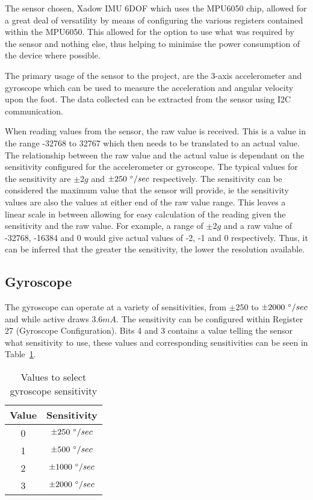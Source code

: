 
The sensor chosen, Xadow IMU 6DOF which uses the MPU6050 chip, allowed for a great deal of versatility by means of configuring the various registers contained within the MPU6050. This allowed for the option to use what was required by the sensor and nothing else, thus helping to minimise the power consumption of the device where possible. \cite{sensor_specs}

The primary usage of the sensor to the project, are the 3-axis accelerometer and gyroscope which can be used to measure the acceleration and angular velocity upon the foot. The data collected can be extracted from the sensor using I2C communication. 

When reading values from the sensor, the raw value is received. This is a value in the range -32768 to 32767 which then needs to be translated to an actual value. The relationship between the raw value and the actual value is dependant on the sensitivity configured for the accelerometer or gyroscope. The typical values for the sensitivity are $\pm 2g$ and $\pm 250~\degree / sec$ respectively. The sensitivity can be considered the maximum value that the sensor will provide, ie the sensitivity values are also the values at either end of the raw value range. This leaves a linear scale in between allowing for easy calculation of the reading given the sensitivity and the raw value. For example, a range of $\pm 2g$ and a raw value of -32768, -16384 and 0 would give actual values of -2, -1 and 0 respectively. Thus, it can be inferred that the greater the sensitivity, the lower the resolution available. \cite{sensor_raw_explanation}

\subsection{Gyroscope}

The gyroscope can operate at a variety of sensitivities, from $\pm 250$ to $\pm 2000~\degree / sec$ and while active draws $3.6mA$. The sensitivity can be configured within Register 27 (Gyroscope Configuration). Bits 4 and 3 contains a value telling the sensor what sensitivity to use, these values and corresponding sensitivities can be seen in Table~\ref{tab:gyro:range}. \cite{sensor_registers}

\begin{table}
	\centering
	\begin{tabular}{|c|c|}
		\hline
		Value & Sensitivity \\
		\hline
		0 & $\pm 250~\degree / sec$ \\
		1 & $\pm 500~\degree / sec$ \\
		2 & $\pm 1000~\degree / sec$ \\
		3 & $\pm 2000~\degree / sec$ \\
		\hline
	\end{tabular}
	\caption{Values to select gyroscope sensitivity}
	\label{tab:gyro:range}
\end{table}

